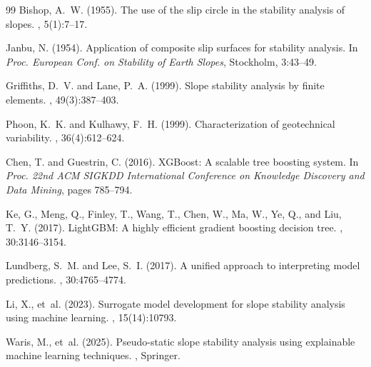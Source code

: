 \documentclass[12pt,a4paper,oneside]{report}
\begin{document}
\begin{thebibliography}{99}
Bishop, A.~W. (1955).
\newblock The use of the slip circle in the stability analysis of slopes.
, 5(1):7--17.

Janbu, N. (1954).
\newblock Application of composite slip surfaces for stability analysis.
\newblock In {\em Proc. European Conf. on Stability of Earth Slopes}, Stockholm, 3:43--49.

Griffiths, D.~V. and Lane, P.~A. (1999).
\newblock Slope stability analysis by finite elements.
, 49(3):387--403.

Phoon, K.~K. and Kulhawy, F.~H. (1999).
\newblock Characterization of geotechnical variability.
, 36(4):612--624.

Chen, T. and Guestrin, C. (2016).
\newblock XGBoost: A scalable tree boosting system.
\newblock In {\em Proc. 22nd ACM SIGKDD International Conference on Knowledge Discovery and Data Mining}, pages 785--794.

Ke, G., Meng, Q., Finley, T., Wang, T., Chen, W., Ma, W., Ye, Q., and Liu, T.~Y. (2017).
\newblock LightGBM: A highly efficient gradient boosting decision tree.
, 30:3146--3154.

Lundberg, S.~M. and Lee, S.~I. (2017).
\newblock A unified approach to interpreting model predictions.
, 30:4765--4774.

Li, X., et~al. (2023).
\newblock Surrogate model development for slope stability analysis using machine learning.
, 15(14):10793.

Waris, M., et~al. (2025).
\newblock Pseudo-static slope stability analysis using explainable machine learning techniques.
, Springer.
\end{thebibliography}
\end{document}
